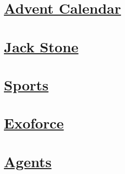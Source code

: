 \section*{\centering \hyperref[contents]{Advent Calendar}}\label{image:Advent Calendar}
\begin{figure}[H]\begin{flushleft}
\end{flushleft}\end{figure}
\vspace{2.5cm}
\section*{\centering \hyperref[contents]{Jack Stone}}\label{image:Jack Stone}
\begin{figure}[H]\begin{flushleft}
\end{flushleft}\end{figure}
\vspace{2.5cm}
\section*{\centering \hyperref[contents]{Sports}}\label{image:Sports}
\begin{figure}[H]\begin{flushleft}
\end{flushleft}\end{figure}
\vspace{2.5cm}
\section*{\centering \hyperref[contents]{Exoforce}}\label{image:Exoforce}
\begin{figure}[H]\begin{flushleft}
\end{flushleft}\end{figure}
\vspace{2.5cm}
\section*{\centering \hyperref[contents]{Agents}}\label{image:Agents}
\begin{figure}[H]\begin{flushleft}
\end{flushleft}\end{figure}
\vspace{2.5cm}
